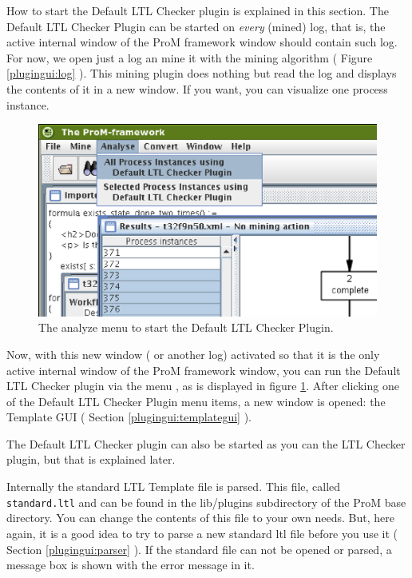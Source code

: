 How to start the Default LTL Checker plugin is explained in this section. The Default LTL Checker Plugin can be started on \textit{every} (mined)
log, that is, the active internal window of the ProM framework window should
contain such log. For now, we open just a log an mine it with the  mining algorithm ( Figure \ref{plugingui:log} ). This mining
plugin does nothing but read the log and displays the contents of it in a new
window. If you want, you can visualize one process instance.

\begin{figure}[H]
    \includegraphics[scale=0.5]{images/framework-log-and-ltl-defaultmenu-cutted.eps}
    \caption{The analyze menu to start the Default LTL Checker Plugin.}
    \label{plugingui:analysemenu}
\end{figure}

Now, with this new window ( or another log) activated so that it is the only
active internal window of the ProM framework window, you can run the Default
LTL Checker plugin via the menu , as is displayed in figure
\ref{plugingui:analysemenu}. After clicking one of the Default LTL Checker
Plugin menu items, a new window is opened: the Template GUI ( Section
\ref{plugingui:templategui} ).

The Default LTL Checker plugin can also be started as you can the LTL
Checker plugin, but that is explained later.

Internally the standard LTL Template file is
parsed. This file, called \texttt{standard.ltl} and can be found in the
lib/plugins subdirectory of the ProM base directory. You can change the
contents of this file to your own needs. But, here again, it is a good idea to
try to parse a new standard ltl file before you use it ( Section
\ref{plugingui:parser} ). If the standard file can not be opened or parsed, a message box is shown with
the error message in it.

